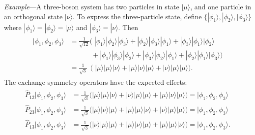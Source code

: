 \documentclass[pra,12pt]{revtex4-2}
\begin{document}
\begin{framed}
\noindent
\textit{Example}---A three-boson system has two particles in state
$|\mu\rangle$, and one particle in an orthogonal state $|\nu\rangle$.
To express the three-particle state, define $\{|\phi_1\rangle,
|\phi_2\rangle, |\phi_3\rangle\}$ where $|\phi_1\rangle =
|\phi_2\rangle = |\mu\rangle$ and $|\phi_3\rangle = |\nu\rangle$.
Then
\begin{align}
  \begin{aligned}
    |\phi_1,\phi_2,\phi_3\rangle &= \frac{1}{\sqrt{12}} \Big( \;
    |\phi_1\rangle|\phi_2\rangle|\phi_3\rangle +
    |\phi_2\rangle|\phi_3\rangle|\phi_1\rangle +
    |\phi_3\rangle|\phi_1\rangle|\phi_2\rangle \\
    &\qquad\quad\, +
    |\phi_1\rangle|\phi_3\rangle|\phi_2\rangle +
    |\phi_3\rangle|\phi_2\rangle|\phi_1\rangle +
    |\phi_2\rangle|\phi_1\rangle|\phi_3\rangle\Big) \\
    &= \frac{1}{\sqrt{3}} \;\, \Big(\;
    |\mu\rangle|\mu\rangle|\nu\rangle +
    |\mu\rangle|\nu\rangle|\mu\rangle +
    |\nu\rangle|\mu\rangle|\mu\rangle\Big).
  \end{aligned}
\end{align}
The exchange symmetry operators have the expected effects:
\begin{align}
  \begin{aligned}
    \hat{P}_{12}|\phi_1,\phi_2,\phi_3\rangle
    &= \frac{1}{\sqrt{3}} \Big(
    |\mu\rangle|\mu\rangle|\nu\rangle +
    |\nu\rangle|\mu\rangle|\mu\rangle +
    |\mu\rangle|\nu\rangle|\mu\rangle\Big)
    = |\phi_1,\phi_2,\phi_3\rangle \\
    \hat{P}_{23}|\phi_1,\phi_2,\phi_3\rangle
    &= \frac{1}{\sqrt{3}} \Big(
    |\mu\rangle|\nu\rangle|\mu\rangle +
    |\mu\rangle|\mu\rangle|\nu\rangle +
    |\nu\rangle|\mu\rangle|\mu\rangle\Big)
    = |\phi_1,\phi_2,\phi_3\rangle\\
    \hat{P}_{13}|\phi_1,\phi_2,\phi_3\rangle
    &= \frac{1}{\sqrt{3}} \Big(
    |\nu\rangle|\mu\rangle|\mu\rangle +
    |\mu\rangle|\nu\rangle|\mu\rangle +
    |\mu\rangle|\mu\rangle|\nu\rangle\Big)
    = |\phi_1,\phi_2,\phi_3\rangle.
  \end{aligned}
\end{align}
\end{framed}
\end{document}
